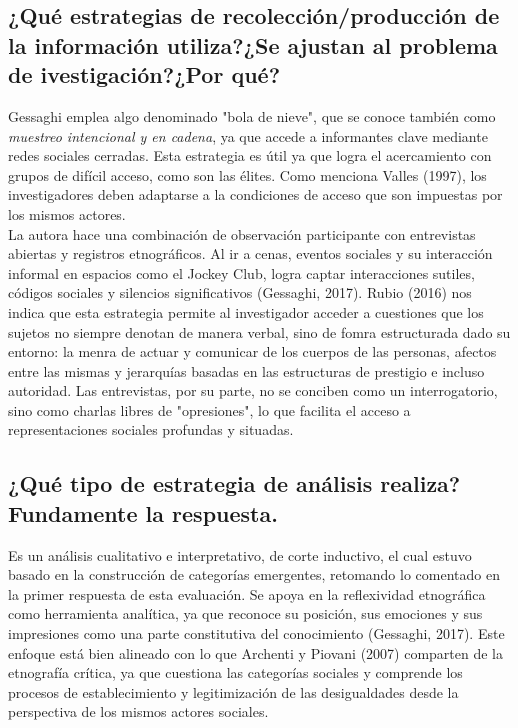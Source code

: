 \documentclass{article}
\begin{document}
\subsection*{¿Qué estrategias de recolección/producción de la información utiliza?¿Se ajustan al problema de ivestigación?¿Por qué?}

Gessaghi emplea algo denominado "bola de nieve", que se conoce también como \textit{muestreo intencional y en cadena}, ya que accede a informantes clave mediante redes sociales cerradas. Esta estrategia es útil ya que logra el acercamiento con grupos de difícil acceso, como son las élites. Como menciona Valles (1997), los investigadores deben adaptarse a la condiciones de acceso que son impuestas por los mismos actores.\\

\noindent La autora hace una combinación de observación participante con entrevistas abiertas y registros etnográficos. Al ir a cenas, eventos sociales y su interacción informal en espacios como el Jockey Club, logra captar interacciones sutiles, códigos sociales y silencios significativos (Gessaghi, 2017). Rubio (2016) nos indica que esta estrategia permite al investigador acceder a cuestiones que los sujetos no siempre denotan de manera verbal, sino de fomra estructurada dado su entorno: la menra de actuar y comunicar de los cuerpos de las personas, afectos entre las mismas y jerarquías basadas en las estructuras de prestigio e incluso autoridad. Las entrevistas, por su parte, no se conciben como un interrogatorio, sino como charlas libres de "opresiones", lo que facilita el acceso a representaciones sociales profundas y situadas.

\subsection*{¿Qué tipo de estrategia de análisis realiza? Fundamente la respuesta.}

Es un análisis cualitativo e interpretativo, de corte inductivo, el cual estuvo basado en la construcción de categorías emergentes, retomando lo comentado en la primer respuesta de esta evaluación. Se apoya en la reflexividad etnográfica como herramienta analítica, ya que reconoce su posición, sus emociones y sus impresiones como una parte constitutiva del conocimiento (Gessaghi, 2017). Este enfoque está bien alineado con lo que Archenti y Piovani (2007) comparten de la etnografía crítica, ya que cuestiona las categorías sociales y comprende los procesos de establecimiento y legitimización de las desigualdades desde la perspectiva de los mismos actores sociales.

\end{document}

